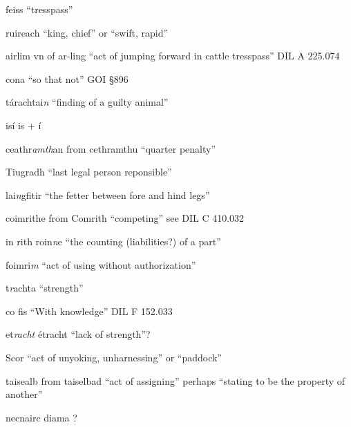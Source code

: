 \documentclass[11pt]{article}
\begin{document}
  \item[feiss] \enquote{tresspass}

  \item[ruireach] \enquote{king, chief} or \enquote{swift, rapid}

  \item[airlim] vn of ar-ling \enquote{act of jumping forward in cattle tresspass} DIL A 225.074

  \item[cona] \enquote{so that not} GOI \S 896

  \item[t\'{a}rachtai\emph{n}] \enquote{finding of a guilty animal}

  \item[is\'{i}] is + \'{i}

  \item[ceathr\emph{amth}an] from cethramthu \enquote{quarter penalty}

  \item[Tiugradh] \enquote{last legal person reponsible}

  \item[lai\emph{n}gfitir] \enquote{the fetter between fore and hind legs}

  \item[coimrithe] from Comrith \enquote{competing} see DIL C 410.032

  \item[in rith roin\emph{n}e] \enquote{the counting (liabilities?) of a part}

  \item[foimri\emph{m}] \enquote{act of using without authorization}
  
  \item[t\emph{r}achta] \enquote{strength}

  \item[co fis] \enquote{With knowledge} DIL F 152.033

  \item[et\emph{racht}] \'{e}tracht \enquote{lack of strength}?

  \item[Scor] \enquote{act of unyoking, unharnessing} or \enquote{paddock}

  \item[taisealb] from taiselbad \enquote{act of assigning} perhaps \enquote{stating to be the property of another}
 
  \item[necnairc diama] ?
\end{document}
